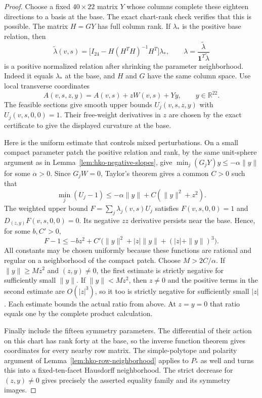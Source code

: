 \begin{proof}
Choose a fixed $40\times22$ matrix $Y$ whose columns complete these
eighteen directions to a basis at the base. The exact chart-rank check
verifies that this is possible. The matrix $H=GY$ has full column rank.
If $\lambda_*$ is the positive base relation, then
\[
 \widetilde\lambda(v,s)
 =\bigl[I_{24}-H(H^TH)^{-1}H^T\bigr]\lambda_*,
 \qquad
 \lambda=\frac{\widetilde\lambda}{\mathbf1^T\widetilde\lambda}
\]
is a positive normalized relation after shrinking the parameter
neighborhood. Indeed it equals $\lambda_*$ at the base, and $H$ and $G$
have the same column space. Use local transverse coordinates
\[
 A(v,s,z,y)=A(v,s)+zW(v,s)+Yy,\qquad y\in\mathbb R^{22}.
\]
The feasible sections give smooth upper bounds $U_j(v,s,z,y)$ with
$U_j(v,s,0,0)=1$. Their free-weight derivatives in $z$ are chosen by the
exact certificate to give the displayed curvature at the base.

Here is the uniform estimate that controls mixed perturbations. On a small
compact parameter patch the positive relation and rank, by the same
unit-sphere argument as in Lemma~\ref{lem:hko-negative-slopes}, give
$\min_j(G_jY)y\leq-\alpha\|y\|$ for some $\alpha>0$.
Since $G_jW=0$, Taylor's theorem gives a common $C>0$ such that
\[
 \min_j(U_j-1)\leq-\alpha\|y\|+C(\|y\|^2+z^2).
\]
The weighted upper bound $F=\sum_j\lambda_j(v,s)U_j$ satisfies
$F(v,s,0,0)=1$ and $D_{(z,y)}F(v,s,0,0)=0$. Its negative $zz$ derivative
persists near the base. Hence, for some $b,C'>0$,
\[
 F-1\leq-bz^2+
 C'\bigl(\|y\|^2+|z|\|y\|+(|z|+\|y\|)^3\bigr).
\]
All constants may be chosen uniformly because these functions are rational
and regular on a neighborhood of the compact patch. Choose
$M>2C/\alpha$. If $\|y\|\geq Mz^2$ and $(z,y)\ne0$, the first estimate
is strictly negative for sufficiently small $\|y\|$. If $\|y\|<Mz^2$,
then $z\ne0$ and the positive terms in the second estimate are
$O(|z|^3)$, so it too is strictly negative for sufficiently small $|z|$.
Each estimate bounds the actual ratio from above. At $z=y=0$ that ratio
equals one by the complete product calculation.

Finally include the fifteen symmetry parameters. The differential of their
action on this chart has rank forty at the base, so the inverse function
theorem gives coordinates for every nearby row matrix. The simple-polytope
and polarity argument of Lemma~\ref{lem:hko-row-neighborhood} applies to
$P_*$ as well and turns this into a fixed-ten-facet Hausdorff neighborhood.
The strict decrease for $(z,y)\ne0$ gives precisely the asserted equality
family and its symmetry images.
\end{proof}

